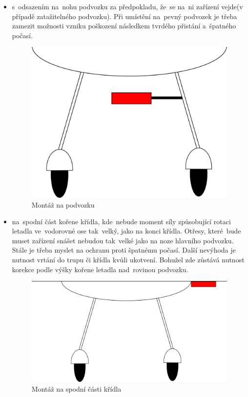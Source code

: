 		\begin{itemize}
			\item s~odsazením na~nohu podvozku za předpokladu, že~se na~ni zařízení vejde(v případě zatažitelného podvozku). Při umístění na~pevný podvozek je třeba zamezit možnosti vzniku poškození následkem tvrdého přistání a~špatného počasí. 
			
			\begin{figure}[H]
				\begin{center}
					\includegraphics[scale=0.5]{obrazky-figures/umisteni_na_podvozku.png}
					\caption{Montáž na podvozku}
					\label{navrh::umisteni_podvozek}
				\end{center}
			\end{figure}
			
			\item na~spodní část kořene křídla, kde~nebude moment síly způsobující rotaci letadla ve~vodorovné ose tak~velký, jako na konci křídla. Otřesy, které~bude muset zařízení snášet nebudou tak~velké jako na noze hlavního podvozku. Stále je třeba myslet na ochranu proti špatnému počasí. Další nevýhoda je nutnost vrtání do trupu či křídla kvůli ukotvení. Bohužel zde zůstává nutnost korekce podle výšky kořene letadla nad~rovinou podvozku.
			
			\begin{figure}[H]
				\begin{center}
					\includegraphics[scale=0.5]{obrazky-figures/umisteni_na_kridle.png}
					\caption{Montáž na spodní části křídla}
					\label{navrh::umisteni_kridlo}
				\end{center}
			\end{figure}
			

\end{itemize}
